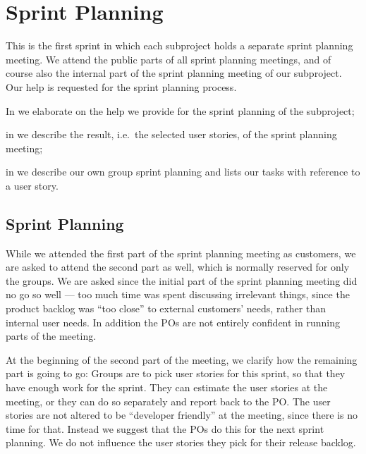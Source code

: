 \chapter{Sprint Planning}\label{chap:s2_sprintplanning}
This is the first sprint in which each subproject holds a separate sprint planning meeting. We attend the public parts of all sprint planning meetings, and of course also the internal part of the sprint planning meeting of our subproject. Our help is requested for the \db sprint planning process.

\begin{chapterorganization}
  \item In  we elaborate on the help we provide for the sprint planning of the \db subproject;
  \item in  we describe the result, i.e.\ the selected user stories, of the \bd sprint planning meeting;
  \item in  we describe our own group sprint planning and lists our tasks with reference to a user story.
\end{chapterorganization}


\section{\dbtitle Sprint Planning}\label{sec:S2_db}
While we attended the first part of the \db sprint planning meeting as customers, we are asked to attend the second part as well, which is normally reserved for only the \db groups. We are asked since the initial part of the sprint planning meeting did no go so well --- too much time was spent discussing irrelevant things, since the product backlog was ``too close'' to external customers' needs, rather than internal user needs. In addition the \db POs are not entirely confident in running parts of the meeting.

At the beginning of the second part of the meeting, we clarify how the remaining part is going to go: Groups are to pick user stories for this sprint, so that they have enough work for the sprint. They can estimate the user stories at the meeting, or they can do so separately and report back to the PO. The user stories are not altered to be ``developer friendly'' at the meeting, since there is no time for that. Instead we suggest that the POs do this for the next sprint planning. We do not influence the user stories they pick for their release backlog.

